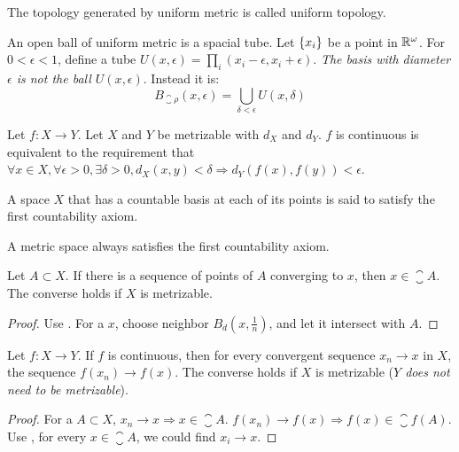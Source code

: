\begin{definition}
    The topology generated by uniform metric is called uniform topology.
    
    An open ball of uniform metric is a spacial tube. Let $\set{x_i}$ be a point in $\mathbb{R}^\omega$. For $0 < \epsilon < 1$, define a tube $U(x,\epsilon) = \prod_i (x_i - \epsilon, x_i + \epsilon)$. \emph{The basis with diameter $\epsilon$ is not the ball $U(x, \epsilon)$}. Instead it is:
    \begin{equation}
        B_{\closure{\rho}}(x, \epsilon) = \bigcup_{\delta < \epsilon} U(x, \delta)
    \end{equation}
\end{definition}

\begin{theorem}
Let $f: X \rightarrow Y$. Let $X$ and $Y$ be metrizable with $d_X$ and $d_Y$. $f$ is continuous is equivalent to the requirement that $\forall x \in X, \forall \epsilon > 0, \exists \delta > 0, d_X (x,y) < \delta \Rightarrow d_Y \left(f(x), f(y) \right) < \epsilon $.
\end{theorem}


\begin{definition}\label{first_countability_axiom}
    A space $X$ that has a countable basis at each of its points is said to satisfy the first countability axiom. 
    
    A metric space always satisfies the first countability axiom.
\end{definition}

\begin{theorem}\label{sequence_lemma}
    Let $A \subset X$. If there is a sequence of points of $A$ converging to $x$, then $x \in \closure{A}$. The converse holds if $X$ is metrizable.
\end{theorem}
\begin{proof}
    Use . For a $x$, choose neighbor $B_d(x, \frac{1}{n})$, and let it intersect with $A$.
\end{proof}


\begin{theorem}
    Let $f: X \rightarrow Y$. If $f$ is continuous, then for every convergent sequence $x_n \rightarrow x$ in $X$, the sequence $f(x_n) \rightarrow f(x)$. The converse holds if $X$ is metrizable (\emph{$Y$ does not need to be metrizable}).
\end{theorem}
\begin{proof}
    For a $A \subset X$,  $x_n \rightarrow x \Rightarrow x \in \closure{A}$. $f(x_n) \rightarrow f(x) \Rightarrow f(x) \in \closure{f(A)}$. Use , for every $x \in \closure{A}$, we could find $x_i \rightarrow x$.
\end{proof}




